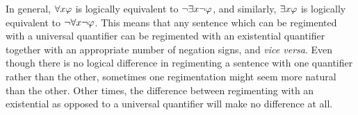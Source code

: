 %
%
%

In general, $\forall x \varphi$ is logically equivalent to $\neg\exists x\neg\varphi$, and similarly, $\exists x \varphi$ is logically equivalent to $\neg\forall x\neg\varphi$.
This means that any sentence which can be regimented with a universal quantifier can be regimented with an existential quantifier together with an appropriate number of negation signs, and \textit{vice versa}.
Even though there is no logical difference in regimenting a sentence with one quantifier rather than the other, sometimes one regimentation might seem more natural than the other.
Other times, the difference between regimenting with an existential as opposed to a universal quantifier will make no difference at all.

